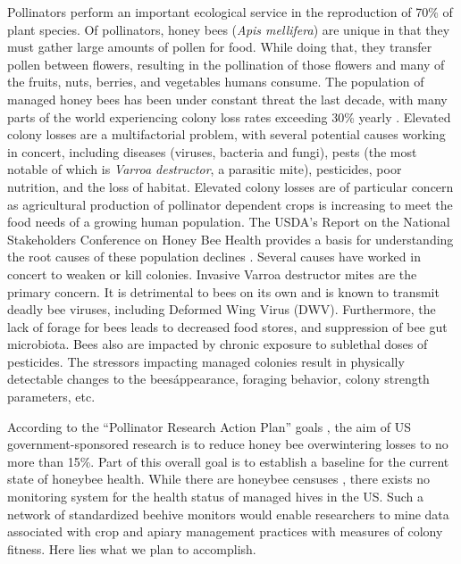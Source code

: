 Pollinators perform an important ecological service in the reproduction of 70\% of plant species. Of pollinators, honey bees (\textit{Apis mellifera}) are unique in that they must gather large amounts of pollen for food. While doing that, they transfer pollen between flowers, resulting in the pollination of those flowers and many of the fruits, nuts, berries, and vegetables humans consume.  The population of managed honey bees has been under constant threat the last decade, with many parts of the world experiencing colony loss rates exceeding 30\% yearly \cite{spivak2010plight}. Elevated colony losses are a multifactorial problem, with several potential causes working in concert, including diseases (viruses, bacteria and fungi), pests (the most notable of which is \textit{Varroa destructor}, a parasitic mite), pesticides, poor nutrition, and the loss of habitat. Elevated colony losses are of particular concern as agricultural production of pollinator dependent crops is increasing to meet the food needs of a growing human population. The USDA's Report on the National Stakeholders Conference on Honey Bee Health provides a basis for understanding the root causes of these population declines \cite{national2012report}. Several causes have worked in concert to weaken or kill colonies. Invasive Varroa destructor mites are the primary concern. It is detrimental to bees on its own and is known to transmit deadly bee viruses, including Deformed Wing Virus (DWV). Furthermore, the lack of forage for bees leads to decreased food stores, and suppression of bee gut microbiota. Bees also are impacted by chronic exposure to sublethal doses of pesticides. The stressors impacting managed colonies result in physically detectable changes to the bees\' appearance, foraging behavior, colony strength parameters, etc.

According to the “Pollinator Research Action Plan” goals \cite{national2015report}, the aim of US government-sponsored research is to reduce honey bee overwintering losses to no more than 15\%. Part of this overall goal is to establish a baseline for the current state of honeybee health. While there are honeybee censuses \cite{vanengelsdorp2011survey}, there exists no monitoring system for the health status of managed hives in the US. Such a network of standardized beehive monitors would enable researchers to mine data associated with crop and apiary management practices with measures of colony fitness. Here lies what we plan to accomplish.

